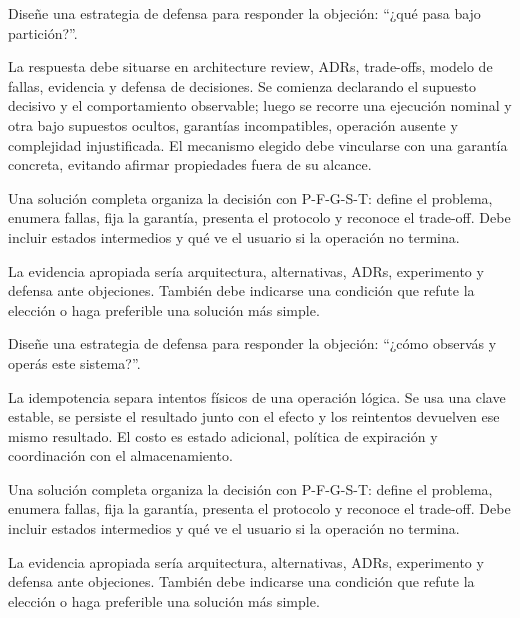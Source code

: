 \documentclass[variant=guia,cover=institutional,mode=screen]{ua-engineering-v6-article}
\begin{document}
\begin{uaexercise}
Diseñe una estrategia de defensa para responder la objeción: “¿qué pasa bajo partición?”.
\end{uaexercise}
\begin{uaanswer}
La respuesta debe situarse en architecture review, ADRs, trade-offs, modelo de fallas, evidencia y defensa de decisiones. Se comienza declarando el supuesto decisivo y el comportamiento observable; luego se recorre una ejecución nominal y otra bajo supuestos ocultos, garantías incompatibles, operación ausente y complejidad injustificada. El mecanismo elegido debe vincularse con una garantía concreta, evitando afirmar propiedades fuera de su alcance.

Una solución completa organiza la decisión con P-F-G-S-T: define el problema, enumera fallas, fija la garantía, presenta el protocolo y reconoce el trade-off. Debe incluir estados intermedios y qué ve el usuario si la operación no termina.

La evidencia apropiada sería arquitectura, alternativas, ADRs, experimento y defensa ante objeciones. También debe indicarse una condición que refute la elección o haga preferible una solución más simple.
\end{uaanswer}

\begin{uaexercise}
Diseñe una estrategia de defensa para responder la objeción: “¿cómo observás y operás este sistema?”.
\end{uaexercise}
\begin{uaanswer}
La idempotencia separa intentos físicos de una operación lógica. Se usa una clave estable, se persiste el resultado junto con el efecto y los reintentos devuelven ese mismo resultado. El costo es estado adicional, política de expiración y coordinación con el almacenamiento.

Una solución completa organiza la decisión con P-F-G-S-T: define el problema, enumera fallas, fija la garantía, presenta el protocolo y reconoce el trade-off. Debe incluir estados intermedios y qué ve el usuario si la operación no termina.

La evidencia apropiada sería arquitectura, alternativas, ADRs, experimento y defensa ante objeciones. También debe indicarse una condición que refute la elección o haga preferible una solución más simple.
\end{uaanswer}
\end{document}
